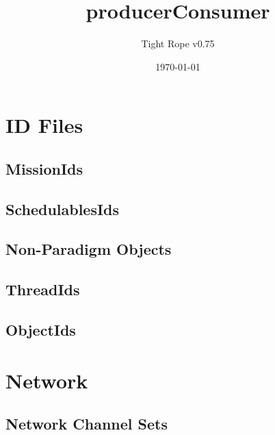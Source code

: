\documentclass[10pt,a4paper]{article}
\title{producerConsumer}
\author{Tight Rope v0.75}
\date{\today}
\begin{document}
\maketitle

\section{ID Files}
\subsection{MissionIds}

\newpage

\subsection{SchedulablesIds}

\newpage

\subsection{Non-Paradigm Objects}

\newpage
{}

\newpage

\subsection{ThreadIds}

\newpage

\subsection{ObjectIds}

\newpage

\section{Network}
\subsection{Network Channel Sets}




{}
\end{document}
